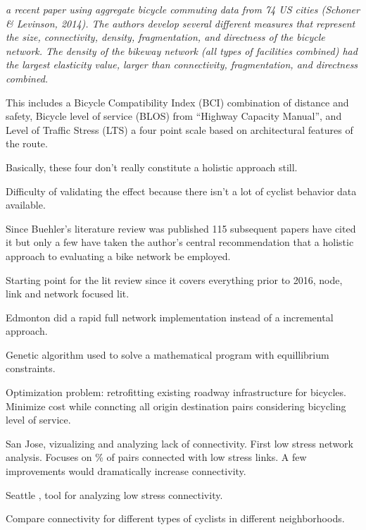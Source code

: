\documentclass[11pt]{article} %
\begin{document}
	\textit{ a recent paper using aggregate bicycle commuting data from 74 US cities (Schoner \& Levinson, 2014). The authors develop several different measures that represent the size, connectivity, density, fragmentation, and directness of the bicycle network. The density of the bikeway network (all types of facilities combined) had the largest elasticity value, larger than connectivity, fragmentation, and directness combined.}
	
	This includes a Bicycle Compatibility Index (BCI) combination of distance and safety, Bicycle level of service (BLOS) from ``Highway Capacity Manual'', \cite{Lowry} and Level of Traffic Stress (LTS) \cite{Mekuria and Furth} a four point scale based on architectural features of the route.
	
	Basically, these four don't really constitute a holistic approach still. 
	
	Difficulty of validating the effect because there isn't a lot of cyclist behavior data available.
	
	
Since Buehler's literature review was published 115 subsequent papers have cited it but only a few have taken the author's central recommendation that a holistic approach to evaluating a bike network be employed. 


Starting point for the lit review since it covers everything prior to 2016, node, link and network focused lit. 
\cite{buehler2016bikeway}

Edmonton did a rapid full network implementation instead of a incremental approach. 
\cite{cabral2019low}

Genetic algorithm used to solve a mathematical program with equillibrium constraints. 
\cite{doorley2019designing}

Optimization problem: retrofitting existing roadway infrastructure for bicycles. Minimize cost while conncting all origin destination pairs considering bicycling level of service. 
\cite{duthie2014optimization}

San Jose, vizualizing and analyzing lack of connectivity. 
First low stress network analysis. Focuses on \% of pairs connected with low stress links. A few improvements would dramatically increase connectivity. 
\cite{furth2016network}

Seattle , tool for analyzing low stress connectivity. 
\cite{lowry2016prioritizing}

Compare connectivity for different types of cyclists in different neighborhoods. 
\cite{lowry2017quantifying}
\end{document}
